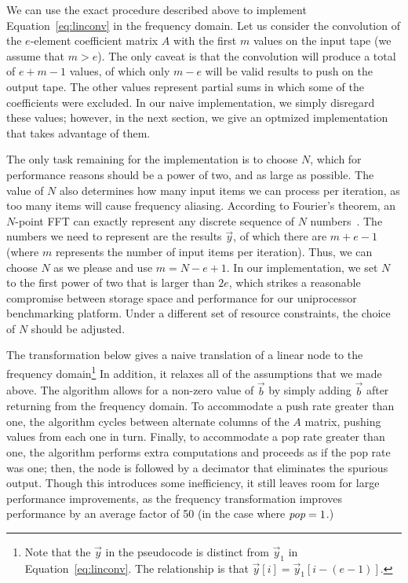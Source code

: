 We can use the exact procedure described above to implement
Equation~\ref{eq:linconv} in the frequency domain.  Let us consider
the convolution of the $e$-element coefficient matrix $A$ with the
first $m$ values on the input tape (we assume that $m>e$).  The only
caveat is that the convolution will produce a total of $e+m-1$ values,
of which only $m-e$ will be valid results to push on the output tape.
The other values represent partial sums in which some of the
coefficients were excluded.  In our naive implementation, we simply
disregard these values; however, in the next section, we give an
optmized implementation that takes advantage of them.

The only task remaining for the implementation is to choose $N$, which
for performance reasons should be a power of two, and as large as
possible.  The value of $N$ also determines how many input items we
can process per iteration, as too many items will cause frequency
aliasing.  According to Fourier's theorem, an $N$-point FFT can
exactly represent any discrete sequence of $N$
numbers~\cite{oppenheim-discrete}.  The numbers we need to represent
are the results ${\vec y}$, of which there are $m+e-1$ (where $m$
represents the number of input items per iteration).  Thus, we can
choose $N$ as we please and use $m = N-e+1$.  In our implementation,
we set $N$ to the first power of two that is larger than $2e$, which
strikes a reasonable compromise between storage space and performance
for our uniprocessor benchmarking platform.  Under a different set of
resource constraints, the choice of $N$ should be adjusted.

The transformation below gives a naive translation of a linear node to
the frequency domain\footnote{Note that the ${\vec y}$ in the
pseudocode is distinct from ${\vec y}_1$ in Equation~\ref{eq:linconv}.
The relationship is that ${\vec y}[i] = {\vec y}_1[i-(e-1)]$.}  In
addition, it relaxes all of the assumptions that we made above.  The
algorithm allows for a non-zero value of ${\vec b}$ by simply adding
${\vec b}$ after returning from the frequency domain.  To accommodate
a push rate greater than one, the algorithm cycles between alternate
columns of the $A$ matrix, pushing values from each one in turn.
Finally, to accommodate a pop rate greater than one, the algorithm
performs extra computations and proceeds as if the pop rate was one;
then, the node is followed by a decimator that eliminates the spurious
output.  Though this introduces some inefficiency, it still leaves
room for large performance improvements, as the frequency
transformation improves performance by an average factor of 50 (in the
case where $\mbox{\it pop}=1$.)

